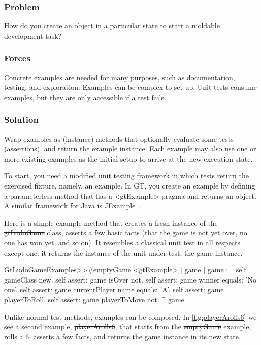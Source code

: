 \documentclass[sigconf]{acmart}
\begin{document}
\subsubsection*{Problem}
How do you create an object in a particular state to start a moldable development task?

\subsubsection*{Forces}
Concrete examples are needed for many purposes, such as documentation, testing, and exploration.
Examples can be complex to set up.
Unit tests consume examples, but they are only accessible if a test fails.

\subsubsection*{Solution}
Wrap examples as (instance) methods that optionally evaluate some tests (assertions), and return the example instance.
Each example may also use one or more existing examples as the initial setup to arrive at the new execution state.

To start, you need a modified unit testing framework in which tests return the exercised fixture, namely, an example.
In GT, you create an example by defining a parameterless method that has a \st{<gtExample>} pragma and returns an object.
A similar framework for Java is JExample~\cite{Kuhn08a}.

Here is a simple example method that creates a fresh instance of the \st{gtLudoGame} class, asserts a few basic facts (\ie that the game is not yet over, no one has won yet, and so on).
It resembles a classical unit test in all respects except one: it returns the instance of the unit under test, \ie the \st{game} instance.

\begin{code}
GtLudoGameExamples>>#emptyGame
	<gtExample>
	| game |
	game := self gameClass new.
	self assert: game isOver not.
	self assert: game winner equals: 'No one'.
	self assert: game currentPlayer name equals: 'A'.
	self assert: game playerToRoll.
	self assert: game playerToMove not.
	^ game
\end{code}
    
Unlike normal test methods, examples can be composed.
In \autoref{fig:playerArolls6} we see a second example, \st{playerArolls6}, that starts from the \st{emptyGame} example, rolls a $6$, asserts a few facts, and returns the game instance in its new state.
\end{document}
